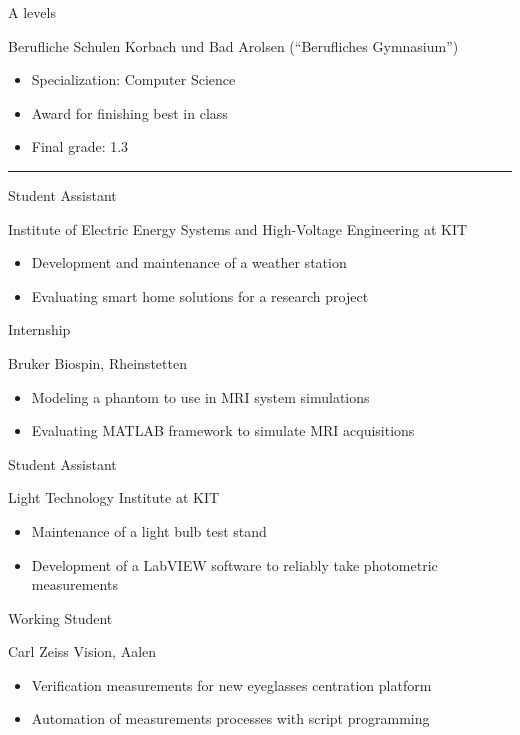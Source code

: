\documentclass[a4paper,10pt]{article}
\newlength{\cvcolumngapwidth}
\newlength{\cvleftcolumnwidth}
\newlength{\cvrightcolumnwidth}
\newcommand{\cvsectionstyle}[1]{{\normalsize\textcolor{cvsectioncolor}{#1}}}
\newcommand{\cvtitlestyle}[1]{{\large\textcolor{cvtitlecolor}{#1}}}
\newcommand{\cvdurationstyle}[1]{{\small\textcolor{cvdurationcolor}{#1}}}
\newlength{\cvafteritemskipamount}
\newlength{\cvaftersectionskipamount}
\newlength{\cvaftertitleskipamount}
\newlength{\cvparskip}
\newcommand{\cvsection}[1]{
    \begin{minipage}[t][][b]{\cvleftcolumnwidth}
        \raggedleft\cvsectionstyle{#1}
    \end{minipage}%
    \hspace{\cvcolumngapwidth}%
    \begin{minipage}[t]{\cvrightcolumnwidth}
        \textcolor{cvrulecolor}{\rule{\cvrightcolumnwidth}{0.3mm}}
    \end{minipage}

    \vspace{\cvaftersectionskipamount}
}
\newcommand{\cvitem}[2]{
    \begin{minipage}[t]{\cvleftcolumnwidth}
    \strut\vspace*{-\baselineskip}\newline %
    \raggedleft #1
    \end{minipage}%
    \hspace{\cvcolumngapwidth}%
    \begin{minipage}[t]{\cvrightcolumnwidth}
        \setlength{\parskip}{\cvparskip}
        \strut\vspace*{-\baselineskip}\newline #2 %
    \end{minipage}

    \vspace{\cvafteritemskipamount}
}
\newcommand{\cvtitle}[1]{
    \cvtitlestyle{#1}

    \vspace{\cvaftertitleskipamount}
    \vspace{-\cvparskip}
}
\begin{document}
\cvitem{\cvdurationstyle{2009 -- 2012}}{\cvtitle{A levels}
    Berufliche Schulen Korbach und Bad Arolsen (``Berufliches Gymnasium'')
    \begin{itemize}[leftmargin=*]
    	\item Specialization: Computer Science
    	\item Award for finishing best in class
        \item Final grade: 1.3
    \end{itemize}
}

\cvsection{WORK EXPERIENCE}

\cvitem{\cvdurationstyle{May 2017 -- now}}{\cvtitle{Student Assistant}
    Institute of Electric Energy Systems and High-Voltage Engineering at KIT
    \begin{itemize}[leftmargin=*]
        \item Development and maintenance of a weather station
        \item Evaluating smart home solutions for a research project
    \end{itemize}
}

\cvitem{\cvdurationstyle{May 2018 -- July 2018}}{\cvtitle{Internship}
    Bruker Biospin, Rheinstetten
    \begin{itemize}[leftmargin=*]
        \item Modeling a phantom to use in MRI system simulations
        \item Evaluating MATLAB framework to simulate MRI acquisitions 
    \end{itemize}
}

\cvitem{\cvdurationstyle{May 2017 -- March 2018}}{\cvtitle{Student Assistant}
    Light Technology Institute at KIT
    \begin{itemize}[leftmargin=*]
        \item Maintenance of a light bulb test stand
        \item Development of a LabVIEW software to reliably take photometric measurements
    \end{itemize}
}

\cvitem{\cvdurationstyle{August 2015}}{\cvtitle{Working Student}
    Carl Zeiss Vision, Aalen
    \begin{itemize}[leftmargin=*]
        \item Verification measurements for new eyeglasses centration platform
        \item Automation of measurements processes with script programming
    \end{itemize}
}
\end{document}
